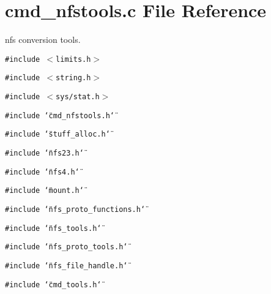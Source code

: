 \section{cmd\_\-nfstools.c File Reference}
\label{cmd__nfstools_8c}
nfs conversion tools. 

{\tt \#include $<$limits.h$>$}\par
{\tt \#include $<$string.h$>$}\par
{\tt \#include $<$sys/stat.h$>$}\par
{\tt \#include \char`\"{}cmd\_\-nfstools.h\char`\"{}}\par
{\tt \#include \char`\"{}stuff\_\-alloc.h\char`\"{}}\par
{\tt \#include \char`\"{}nfs23.h\char`\"{}}\par
{\tt \#include \char`\"{}nfs4.h\char`\"{}}\par
{\tt \#include \char`\"{}mount.h\char`\"{}}\par
{\tt \#include \char`\"{}nfs\_\-proto\_\-functions.h\char`\"{}}\par
{\tt \#include \char`\"{}nfs\_\-tools.h\char`\"{}}\par
{\tt \#include \char`\"{}nfs\_\-proto\_\-tools.h\char`\"{}}\par
{\tt \#include \char`\"{}nfs\_\-file\_\-handle.h\char`\"{}}\par
{\tt \#include \char`\"{}cmd\_\-tools.h\char`\"{}}\par
